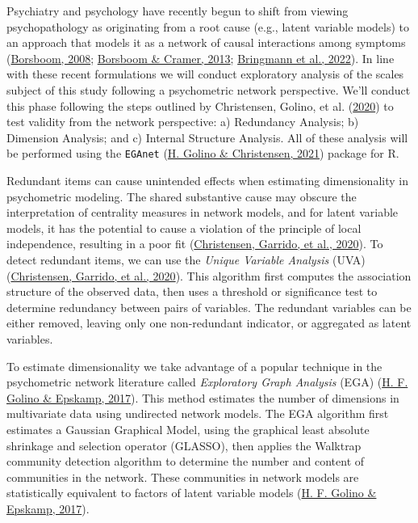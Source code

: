 \documentclass[
  ,doc,11pt, twoside,floatsintext]{apa6}
\begin{document}
Psychiatry and psychology have recently begun to shift from viewing psychopathology as originating from a root cause (e.g., latent variable models) to an approach that models it as a network of causal interactions among symptoms (\protect\hyperlink{ref-borsboom2008}{Borsboom, 2008}; \protect\hyperlink{ref-borsboom2013}{Borsboom \& Cramer, 2013}; \protect\hyperlink{ref-bringmann2022}{Bringmann et al., 2022}). In line with these recent formulations we will conduct exploratory analysis of the scales subject of this study following a psychometric network perspective. We'll conduct this phase following the steps outlined by Christensen, Golino, et al. (\protect\hyperlink{ref-christensen2020b}{2020}) to test validity from the network perspective: a) Redundancy Analysis; b) Dimension Analysis; and c) Internal Structure Analysis. All of these analysis will be performed using the \texttt{EGAnet} (\protect\hyperlink{ref-EGAnet}{H. Golino \& Christensen, 2021}) package for R.

Redundant items can cause unintended effects when estimating dimensionality in psychometric modeling. The shared substantive cause may obscure the interpretation of centrality measures in network models, and for latent variable models, it has the potential to cause a violation of the principle of local independence, resulting in a poor fit (\protect\hyperlink{ref-christensen2020a}{Christensen, Garrido, et al., 2020}). To detect redundant items, we can use the \emph{Unique Variable Analysis} (UVA) (\protect\hyperlink{ref-christensen2020a}{Christensen, Garrido, et al., 2020}). This algorithm first computes the association structure of the observed data, then uses a threshold or significance test to determine redundancy between pairs of variables. The redundant variables can be either removed, leaving only one non-redundant indicator, or aggregated as latent variables.

To estimate dimensionality we take advantage of a popular technique in the psychometric network literature called \emph{Exploratory Graph Analysis} (EGA) (\protect\hyperlink{ref-golino2017}{H. F. Golino \& Epskamp, 2017}). This method estimates the number of dimensions in multivariate data using undirected network models. The EGA algorithm first estimates a Gaussian Graphical Model, using the graphical least absolute shrinkage and selection operator (GLASSO), then applies the Walktrap community detection algorithm to determine the number and content of communities in the network. These communities in network models are statistically equivalent to factors of latent variable models (\protect\hyperlink{ref-golino2017}{H. F. Golino \& Epskamp, 2017}).
\end{document}
